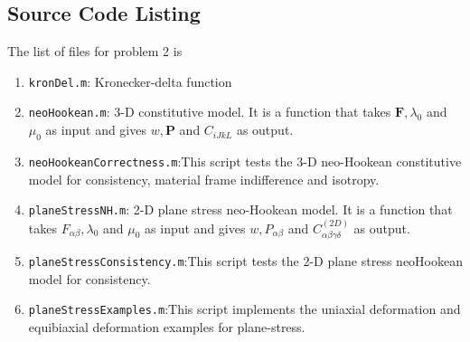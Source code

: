 \documentclass[../main.tex]{subfiles}
\begin{document}
\subsection{Source Code Listing}
The list of files for problem 2 is
\begin{enumerate}
\item \texttt{kronDel.m}: Kronecker-delta function
\item \texttt{neoHookean.m}: 3-D constitutive model. It is a function
  that takes $\mathbf{F},\lambda_0$ and $\mu_0$ as input and gives
  $w,\mathbf{P}$ and $C_{iJkL}$ as output.
\item \texttt{neoHookeanCorrectness.m}:This script tests the 3-D
  neo-Hookean constitutive model for consistency, material frame
  indifference and isotropy.
\item \texttt{planeStressNH.m}: 2-D plane stress neo-Hookean model. It
  is a function that takes $F_{\alpha\beta},\lambda_0$ and $\mu_0$ as
  input and gives $w,P_{\alpha\beta}$ and
  $C^{(2D)}_{\alpha\beta\gamma\delta}$ as output.
\item \texttt{planeStressConsistency.m}:This script tests the 2-D
  plane stress neoHookean model for consistency.
\item \texttt{planeStressExamples.m}:This script implements the
  uniaxial deformation and equibiaxial deformation examples for
  plane-stress.
\end{enumerate}
\end{document}
